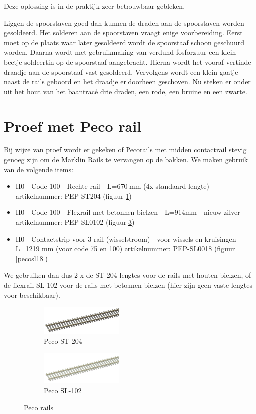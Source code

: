 \documentclass[12pt,a4paper]{report}
\newcommand*{\trace}{trac\'{e} }
\begin{document}
Deze oplossing is in de praktijk zeer betrouwbaar gebleken.

Liggen de spoorstaven goed dan kunnen de draden aan de spoorstaven worden gesoldeerd. Het solderen aan de spoorstaven vraagt enige voorbereiding. Eerst moet op de plaats waar later gesoldeerd wordt de spoorstaaf schoon geschuurd worden. Daarna wordt met gebruikmaking van verdund fosforzuur een klein beetje soldeertin op de spoorstaaf aangebracht. Hierna wordt het vooraf vertinde draadje aan de spoorstaaf vast gesoldeerd. Vervolgens wordt een klein gaatje naast de rails geboord en het draadje er doorheen geschoven. Nu steken er onder uit het hout van het baan\trace drie draden, een rode, een bruine en een zwarte.

\section{Proef met Peco rail}

Bij wijze van proef wordt er gekeken of Pecorails met midden contactrail stevig genoeg zijn om de Marklin Rails te vervangen op de bakken. We maken gebruik van de volgende items:

\begin{itemize}
\item H0 - Code 100 - Rechte rail - L=670 mm (4x standaard lengte) artikelnummer: PEP-ST204 (figuur \ref{pecost204})
\item H0 - Code 100 - Flexrail met betonnen bielzen - L=914mm - nieuw zilver artikelnummer: PEP-SL0102 (figuur \ref{pecosl102})
\item H0 - Contactstrip voor 3-rail (wisselstroom) - voor wissels en kruisingen - L=1219 mm (voor code 75 en 100) artikelnummer: PEP-SL0018 (figuur \ref{pecosl18})
\end{itemize}

We gebruiken dan dus 2 x de ST-204 lengtes voor de rails met houten bielzen, of de flexrail SL-102 voor de rails met betonnen bielzen (hier zijn geen vaste lengtes voor beschikbaar).

\begin{figure}
\centering
\begin{subfigure}{.5\textwidth}
  \includegraphics[scale=1.0]{images/rcu_peco_st204}
  \caption{Peco ST-204\label{pecost204}}
\end{subfigure}%
\begin{subfigure}{.5\textwidth}
  \includegraphics[scale=1.0]{images/rcu_peco_sl102}
  \caption{Peco SL-102\label{pecosl102}}
\end{subfigure}
\caption{Peco rails}
\end{figure}
\end{document}
